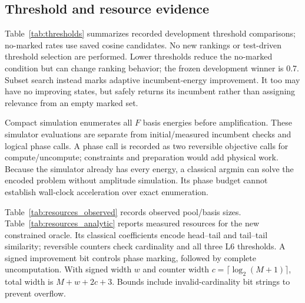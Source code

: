 \documentclass[conference]{IEEEtran}
\newcommand{\resultinput}[1]{}
\begin{document}
\subsection{Threshold and resource evidence}
Table~\ref{tab:thresholds} summarizes recorded development threshold comparisons; no-marked rates use saved cosine candidates. No new rankings or test-driven threshold selection are performed. Lower thresholds reduce the no-marked condition but can change ranking behavior; the frozen development winner is 0.7. Subset search instead marks adaptive incumbent-energy improvement. It too may have no improving states, but safely returns its incumbent rather than assigning relevance from an empty marked set.

\begin{table}[t]
\centering\small\setlength{\tabcolsep}{7pt}
\caption{Legacy development thresholds. n@5 uses stored matched-sampling outcomes; None is the percentage of saved queries with no cosine candidate meeting the threshold. Query-level rates do not treat seeds as independent observations.}
\label{tab:thresholds}
\resultinput{thresholds.tex}
\end{table}

\begin{table}[t]
\centering\small\setlength{\tabcolsep}{3pt}
\caption{Observed protected-refinement resource ranges over seeded requests. Refine ms is median refinement-only time, not online or combined selection time.}
\label{tab:resources_observed}
\resultinput{resources_observed.tex}
\end{table}

Compact simulation enumerates all \(F\) basis energies before amplification. These simulator evaluations are separate from initial/measured incumbent checks and logical phase calls. A phase call is recorded as two reversible objective calls for compute/uncompute; constraints and preparation would add physical work. Because the simulator already has every energy, a classical argmin can solve the encoded problem without amplitude simulation. Its phase budget cannot establish wall-clock acceleration over exact enumeration.

Table~\ref{tab:resources_observed} records observed pool/basis sizes. Table~\ref{tab:resources_analytic} reports measured resources for the new constrained oracle. Its classical coefficients encode head--tail and tail--tail similarity; reversible counters check cardinality and all three L6 thresholds. A signed improvement bit controls phase marking, followed by complete uncomputation. With signed width \(w\) and counter width \(c=\lceil\log_2(M+1)\rceil\), total width is \(M+w+2c+3\). Bounds include invalid-cardinality bit strings to prevent overflow.
\end{document}
